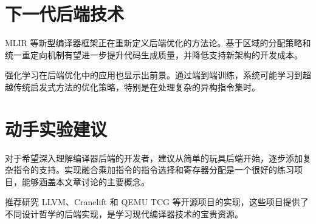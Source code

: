\section{下一代后端技术}
MLIR 等新型编译器框架正在重新定义后端优化的方法论。基于区域的分配策略和统一重定向机制有望进一步提升代码生成质量，并降低支持新架构的开发成本。\par
强化学习在后端优化中的应用也显示出前景。通过端到端训练，系统可能学习到超越传统启发式方法的优化策略，特别是在处理复杂的异构指令集时。\par
\section{动手实验建议}
对于希望深入理解编译器后端的开发者，建议从简单的玩具后端开始，逐步添加复杂指令的支持。实现融合乘加指令的指令选择和寄存器分配是一个很好的练习项目，能够涵盖本文章讨论的主要概念。\par
推荐研究 LLVM、Cranelift 和 QEMU TCG 等开源项目的实现，这些项目提供了不同设计哲学的后端实现，是学习现代编译器技术的宝贵资源。\par
